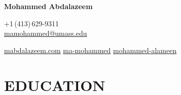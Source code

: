 \documentclass[10pt, a4paper]{article}
\newcommand{\whitelink}[2]{\href{#1}{\color{white}#2}}
\begin{document}

\begin{tcolorbox}[
  enhanced,
  arc=0pt, outer arc=0pt,
  colback=accent, colframe=accent,
  boxrule=0pt, left=0pt, right=0pt, top=0pt, bottom=0pt,
  enlarge left by=-1.8cm,
  enlarge right by=-1.8cm,
  enlarge top by=-1.8cm,
  width=\paperwidth,
]
  \vspace{0.5cm}\hspace{1.8cm}%
  \begin{minipage}[c]{\dimexpr\paperwidth - 3.6cm\relax}
    \noindent
    \begin{minipage}[t]{0.62\linewidth}
      \vspace{0pt}%
      {\color{white}\fontsize{22}{26}\selectfont\bfseries Mohammed Abdalazeem%
       \,}
    \end{minipage}%
    \hfill
    \begin{minipage}[t]{0.35\linewidth}
      \vspace{8pt}%
      \raggedleft
      {\color{white}\small
        \faPhone\enspace+1\,(413)\,629-9311\\[4pt]
        \faEnvelope\enspace\whitelink{mailto:mamohammed@umass.edu}{mamohammed@umass.edu}%
      }
    \end{minipage}
    \vspace{5pt}
    {\color{white}\small
      \faGlobe\enspace\whitelink{https://mabdalazeem.com}{mabdalazeem.com}\hspace{1.4em}%
      \faGithub\enspace\whitelink{https://github.com/ma-mohammed}{ma-mohammed}\hspace{1.4em}%
      \faLinkedin\enspace\whitelink{https://www.linkedin.com/in/mohammed-alameen/}{mohammed-alameen}%
    }
  \end{minipage}\hspace{1.8cm}%
  \vspace{0.5cm}
\end{tcolorbox}

\vspace{0.5cm}

\section{EDUCATION}
\end{document}
